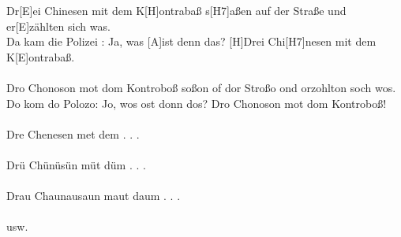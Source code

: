 \documentclass[10pt,a5paper]{article}
\begin{document}
\begin{guitar}
Dr[E]ei Chinesen mit dem K[H]ontrabaß s[H7]aßen auf der Straße und er[E]zählten sich was.\\
Da kam die Polizei : Ja, was [A]ist denn das? [H]Drei Chi[H7]nesen mit dem K[E]ontrabaß.\\\
\\
Dro Chonoson mot dom Kontroboß soßon of dor Stroßo ond orzohlton soch wos.\\
Do kom do Polozo: Jo, wos ost donn dos? Dro Chonoson mot dom Kontroboß!\\
\\
Dre Chenesen met dem . . .\\
\\
Drü Chünüsün müt düm . . .\\
\\
Drau Chaunausaun maut daum . . .\\
\\
usw.
\end{guitar}

  	
  	  
\newpage  
\end{document}
